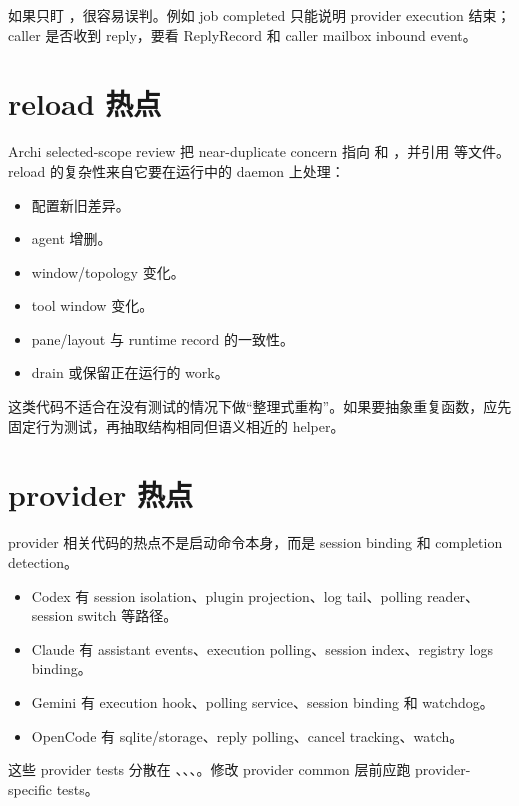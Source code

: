 如果只盯 ，很容易误判。例如 job completed 只能说明 provider execution 结束；caller 是否收到 reply，要看 ReplyRecord 和 caller mailbox inbound event。

\section{reload 热点}

Archi selected-scope review 把 near-duplicate concern 指向  和 ，并引用  等文件。reload 的复杂性来自它要在运行中的 daemon 上处理：

\begin{itemize}
  \item 配置新旧差异。
  \item agent 增删。
  \item window/topology 变化。
  \item tool window 变化。
  \item pane/layout 与 runtime record 的一致性。
  \item drain 或保留正在运行的 work。
\end{itemize}

这类代码不适合在没有测试的情况下做“整理式重构”。如果要抽象重复函数，应先固定行为测试，再抽取结构相同但语义相近的 helper。

\section{provider 热点}

provider 相关代码的热点不是启动命令本身，而是 session binding 和 completion detection。

\begin{itemize}
  \item Codex 有 session isolation、plugin projection、log tail、polling reader、session switch 等路径。
  \item Claude 有 assistant events、execution polling、session index、registry logs binding。
  \item Gemini 有 execution hook、polling service、session binding 和 watchdog。
  \item OpenCode 有 sqlite/storage、reply polling、cancel tracking、watch。
\end{itemize}

这些 provider tests 分散在 、、、。修改 provider common 层前应跑 provider-specific tests。

